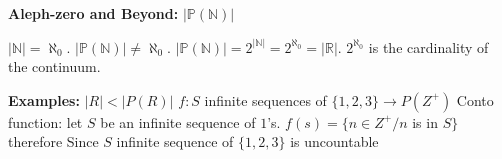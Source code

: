 \documentclass{article}
\begin{document}
\begin{multicols}{3}
\noindent\textbf{Aleph-zero and Beyond:} $|\mathbb{P}(\mathbb{N})|$

\noindent $|\mathbb{N}| = \aleph_0$. $|\mathbb{P}(\mathbb{N})| \neq \aleph_0$. $|\mathbb{P}(\mathbb{N})| = 2^{|\mathbb{N}|} = 2^{\aleph_0} = |\mathbb{R}|$.
$2^{\aleph_0}$ is the cardinality of the continuum.

\noindent \textbf{Examples:}
$|R| < |P(R)|$
$f: S$ infinite sequences of $\{1, 2, 3\} \rightarrow P(Z^+)$
Conto function: let $S$ be an infinite sequence of $1$'s. $f(s) = \{n \in Z^+ / n$ is in $S\}$ therefore
Since $S$ infinite sequence of $\{1, 2, 3\}$ is uncountable

\end{multicols}
\end{document}
